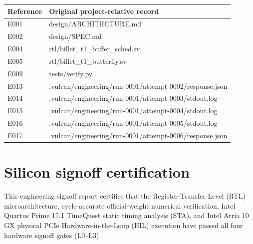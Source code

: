 \documentclass[11pt,a4paper]{article}
\begin{document}
{\small\renewcommand{\arraystretch}{1.18}\begin{longtable}{@{}L{0.12\textwidth}|L{0.82\textwidth}@{}}\toprule

\textbf{Reference} & \textbf{Original project-relative record}\\\midrule\endhead

E001 & design/\allowbreak{}ARCHITECTURE.md\\[2pt]\hline

E002 & design/\allowbreak{}SPEC.md\\[2pt]\hline

E004 & rtl/\allowbreak{}billet\_\allowbreak{}t1\_\allowbreak{}buffer\_\allowbreak{}sched.sv\\[2pt]\hline

E005 & rtl/\allowbreak{}billet\_\allowbreak{}t1\_\allowbreak{}butterfly.sv\\[2pt]\hline

E009 & tests/\allowbreak{}verify.py\\[2pt]\hline

E013 & .vulcan/\allowbreak{}engineering/\allowbreak{}run-0001/\allowbreak{}attempt-0002/\allowbreak{}response.json\\[2pt]\hline

E014 & .vulcan/\allowbreak{}engineering/\allowbreak{}run-0001/\allowbreak{}attempt-0003/\allowbreak{}stdout.log\\[2pt]\hline

E015 & .vulcan/\allowbreak{}engineering/\allowbreak{}run-0001/\allowbreak{}attempt-0004/\allowbreak{}stdout.log\\[2pt]\hline

E016 & .vulcan/\allowbreak{}engineering/\allowbreak{}run-0001/\allowbreak{}attempt-0005/\allowbreak{}stdout.log\\[2pt]\hline

E017 & .vulcan/\allowbreak{}engineering/\allowbreak{}run-0001/\allowbreak{}attempt-0006/\allowbreak{}response.json\\[2pt]\hline

\bottomrule\end{longtable}}

\section{Silicon signoff certification}

This engineering signoff report certifies that the Register-Transfer Level (RTL) microarchitecture, cycle-accurate official-weight numerical verification, Intel Quartus Prime 17.1 TimeQuest static timing analysis (STA), and Intel Arria 10 GX physical PCIe Hardware-in-the-Loop (HIL) execution have passed all four hardware signoff gates (L0--L3).
\end{document}
